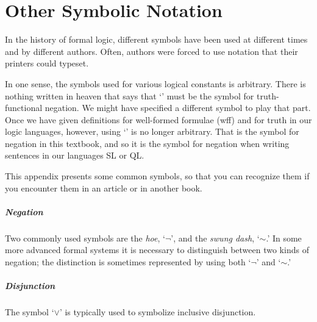\chapter{Other Symbolic Notation}
\label{app.notation}

In the history of formal logic, different symbols have been used at different times and by different authors. Often, authors were forced to use notation that their printers could typeset.

In one sense, the symbols used for various logical constants is arbitrary. There is nothing written in heaven that says that `\enot' must be the symbol for truth-functional negation. We might have specified a different symbol to play that part. Once we have given definitions for well-formed formulae (wff) and for truth in our logic languages, however, using `\enot' is no longer arbitrary. That is the symbol for negation in this textbook, and so it is the symbol for negation when writing sentences in our languages SL or QL.

This appendix presents some common symbols, so that you can recognize them if you encounter them in an article or in another book.

\paragraph{Negation} Two commonly used symbols are the \emph{hoe}, `$\neg$', and the \emph{swung dash}, `${\sim}$.' In some more advanced formal systems it is necessary to distinguish between two kinds of negation; the distinction is sometimes represented by using both `$\neg$' and `${\sim}$.'

\paragraph{Disjunction} The symbol `$\vee$' is typically used to symbolize inclusive disjunction. %

